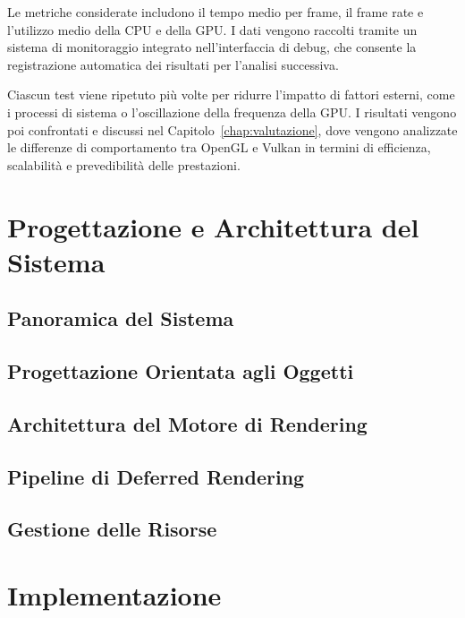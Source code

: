 \documentclass[12pt,a4paper,openright,twoside]{book}
\begin{document}
Le metriche considerate includono il tempo medio per frame, il frame rate e l'utilizzo medio della CPU e della GPU.
I dati vengono raccolti tramite un sistema di monitoraggio integrato nell'interfaccia di debug, che consente la
registrazione automatica dei risultati per l'analisi successiva.

Ciascun test viene ripetuto più volte per ridurre l'impatto di fattori esterni, come i processi di sistema o
l'oscillazione della frequenza della GPU. I risultati vengono poi confrontati e discussi nel
Capitolo~\ref{chap:valutazione}, dove vengono analizzate le differenze di comportamento tra OpenGL e Vulkan in termini
di efficienza, scalabilità e prevedibilità delle prestazioni.

\chapter{Progettazione e Architettura del Sistema}
\label{chap:design}

\section{Panoramica del Sistema}

\section{Progettazione Orientata agli Oggetti}

\section{Architettura del Motore di Rendering}

\section{Pipeline di Deferred Rendering}

\section{Gestione delle Risorse}

\chapter{Implementazione}
\label{chap:implementazione}
\end{document}
